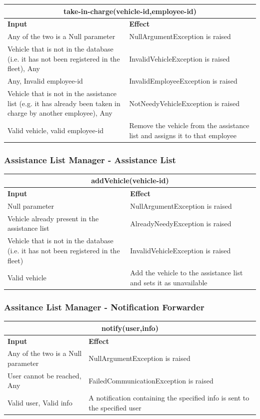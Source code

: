 \documentclass{article}
\begin{document}
\begin{tabular}{ |p{5cm}|p{7cm}| }
  \hline
  \multicolumn{2}{|c|}{take-in-charge(vehicle-id,employee-id)} \\
  \hline
  \textbf{Input} & \textbf{Effect} \\
  \hline
  Any of the two is a Null parameter & NullArgumentException is raised\\
  \hline
 Vehicle that is not in the database (i.e. it has not been registered in the fleet), Any & InvalidVehicleException is raised\\
  \hline
  Any, Invalid employee-id & InvalidEmployeeException is raised\\
  \hline
  Vehicle that is not in the assistance list (e.g. it has already been taken in charge by another employee), Any & NotNeedyVehicleException is raised\\
  \hline
  Valid vehicle, valid employee-id & Remove the vehicle from the assistance list and assigns it to that employee\\
  \hline
\end{tabular}
\subsubsection{Assistance List Manager - Assistance List}
\begin{tabular}{ |p{5cm}|p{7cm}| }
  \hline
  \multicolumn{2}{|c|}{addVehicle(vehicle-id)} \\
  \hline
  \textbf{Input} & \textbf{Effect} \\
  \hline
  Null parameter & NullArgumentException is raised\\
  \hline
  Vehicle already present in the assistance list & AlreadyNeedyException is raised\\
  \hline
  Vehicle that is not in the database (i.e. it has not been registered in the fleet) & InvalidVehicleException is raised\\
  \hline
  Valid vehicle & Add the vehicle to the assistance list and sets it as unavailable\\
  \hline
\end{tabular}
\subsubsection{Assitance List Manager - Notification Forwarder}
\begin{tabular}{ |p{5cm}|p{7cm}| }
  \hline
  \multicolumn{2}{|c|}{notify(user,info)} \\
  \hline
  \textbf{Input} & \textbf{Effect} \\
  \hline
   Any of the two is a Null parameter & NullArgumentException is raised\\
  \hline
 User cannot be reached, Any & FailedCommunicationException is raised\\
  \hline
  Valid user, Valid info & A notification containing the specified info is sent to the specified user\\
  \hline
\end{tabular}
\end{document}

